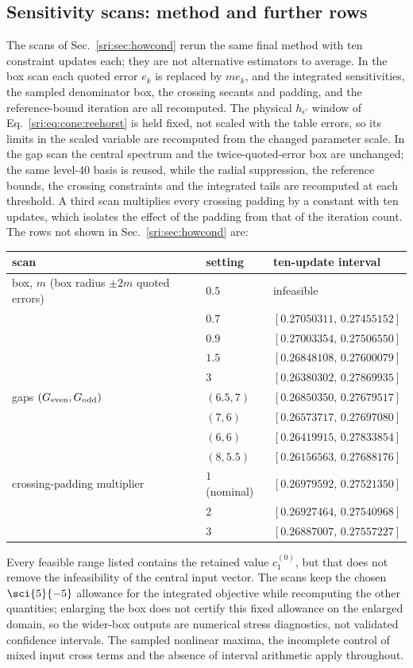 \subsection{Sensitivity scans: method and further rows}\label{sri:app:cone:sensitivity}
The scans of Sec.~\ref{sri:sec:howcond} rerun the same final method with ten constraint updates each; they are not
alternative estimators to average. In the box scan each quoted error $e_k$ is replaced by $me_k$, and the integrated
sensitivities, the sampled denominator box, the crossing secants and padding, and the reference-bound iteration are all
recomputed. The physical $h_{\epsilon'}$ window of Eq.~\eqref{sri:eq:cone:reehorst} is held fixed, not scaled with the table
errors, so its limits in the scaled variable are recomputed from the changed parameter scale. In the gap scan the
central spectrum and the twice-quoted-error box are unchanged; the same level-40 basis is reused, while the radial
suppression, the reference bounds, the crossing constraints and the integrated tails are recomputed at each threshold.
A third scan multiplies every crossing padding by a constant with ten updates, which isolates the effect of the padding
from that of the iteration count. The rows not shown in Sec.~\ref{sri:sec:howcond} are:
\begin{center}\small
\begin{tabular}{@{}lll@{}}
\toprule
scan & setting & ten-update interval\\
\midrule
box, $m$ (box radius $\pm2m$ quoted errors) & $0.5$ & infeasible\\
 & $0.7$ & $[0.27050311,\,0.27455152]$\\
 & $0.9$ & $[0.27003354,\,0.27506550]$\\
 & $1.5$ & $[0.26848108,\,0.27600079]$\\
 & $3$ & $[0.26380302,\,0.27869935]$\\
\midrule
gaps $(G_{\rm even},G_{\rm odd})$ & $(6.5,7)$ & $[0.26850350,\,0.27679517]$\\
 & $(7,6)$ & $[0.26573717,\,0.27697080]$\\
 & $(6,6)$ & $[0.26419915,\,0.27833854]$\\
 & $(8,5.5)$ & $[0.26156563,\,0.27688176]$\\
\midrule
crossing-padding multiplier & $1$ (nominal) & $[0.26979592,\,0.27521350]$\\
 & $2$ & $[0.26927464,\,0.27540968]$\\
 & $3$ & $[0.26887007,\,0.27557227]$\\
\bottomrule
\end{tabular}
\end{center}
Every feasible range listed contains the retained value $c_1^{(0)}$, but that does not remove the infeasibility of the
central input vector. The scans keep the chosen $\sci{5}{-5}$ allowance for the integrated objective while recomputing
the other quantities; enlarging the box does not certify this fixed allowance on the enlarged domain, so the wider-box
outputs are numerical stress diagnostics, not validated confidence intervals. The sampled nonlinear maxima, the
incomplete control of mixed input cross terms and the absence of interval arithmetic apply throughout.

